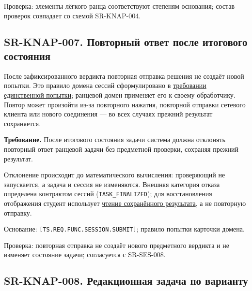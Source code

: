 \documentclass[12pt,a4paper]{article}
\begin{document}
Проверка: элементы лёгкого ранца соответствуют степеням основания; состав проверок совпадает со схемой SR-KNAP-004.

\subsection{SR-KNAP-007. Повторный ответ после итогового состояния}\label{sr-knap-007-ux43fux43eux432ux442ux43eux440ux43dux44bux439-ux43eux442ux432ux435ux442-ux43fux43eux441ux43bux435-ux438ux442ux43eux433ux43eux432ux43eux433ux43e-ux441ux43eux441ux442ux43eux44fux43dux438ux44f}

\hypertarget{sr-knap-007-повторный-ответ-после-итогового-состояния}{}

После зафиксированного вердикта повторная отправка решения не создаёт новой попытки. Это правило домена сессий сформулировано в \hyperref[sr-ses-008-ux43eux434ux43dux430-ux43fux440ux435ux434ux43cux435ux442ux43dux430ux44f-ux43fux43eux43fux44bux442ux43aux430]{требовании единственной попытки}; ранцевой домен применяет его к своему обработчику. Повтор может произойти из-за повторного нажатия, повторной отправки сетевого клиента или нового соединения --- во всех случаях прежний результат сохраняется.

\textbf{Требование.} После итогового состояния задачи система должна отклонять повторный ответ ранцевой задачи без предметной проверки, сохраняя прежний результат.

Отклонение происходит до математического вычисления: проверяющий не запускается, а задача и сессия не изменяются. Внешняя категория отказа определена контрактом сессий (\texttt{TASK\_FINALIZED}); для восстановления отображения студент использует \hyperref[sr-ses-014-ux43fux43eux43bux443ux447ux435ux43dux438ux435-ux441ux43eux445ux440ux430ux43dux451ux43dux43dux43eux433ux43e-ux440ux435ux437ux443ux43bux44cux442ux430ux442ux430]{чтение сохранённого результата}, а не повторную отправку.

Основание: \texttt{[TS.\allowbreak{}REQ.\allowbreak{}FUNC.\allowbreak{}SESSION.\allowbreak{}SUBMIT]}; правило попытки карточки домена.

Проверка: повторная отправка не создаёт нового предметного вердикта и не изменяет состояние задачи; согласуется с SR-SES-008.

\subsection{SR-KNAP-008. Редакционная задача по варианту}\label{sr-knap-008-ux440ux435ux434ux430ux43aux446ux438ux43eux43dux43dux430ux44f-ux437ux430ux434ux430ux447ux430-ux43fux43e-ux432ux430ux440ux438ux430ux43dux442ux443}
\end{document}
